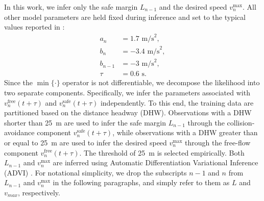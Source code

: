 \documentclass[journal]{IEEEtran}
\begin{document}
In this work, we infer only the safe margin $L_{n-1}$ and the desired speed $v_n^{\max}$. All other model parameters are held fixed during inference and set to the typical values reported in \cite{Gipps1981}:
\begin{align*}
    a_n&=1.7 \text{ m/s}^2, \\ 
    b_n&=-3.4 \text{ m/s}^2, \\
    b_{n-1}&=-3 \text{ m/s}^2, \\
    \tau&=0.6 \text{ s}.
\end{align*}
Since the $\min\{\cdot\}$ operator is not differentiable, we decompose the likelihood into two separate components. Specifically, we infer the parameters associated with $v_n^{\text{free}}(t+\tau)$ and $v_n^{\text{safe}}(t+\tau)$ independently. To this end, the training data are partitioned based on the distance headway (DHW). Observations with a DHW shorter than 25~m are used to infer the safe margin $L_{n-1}$ through the collision-avoidance component $v_n^{\text{safe}}(t+\tau)$, while observations with a DHW greater than or equal to 25~m are used to infer the desired speed $v_n^{\max}$ through the free-flow component $v_n^{\text{free}}(t+\tau)$. The threshold of 25~m is selected empirically. Both $L_{n-1}$ and $v_n^{\max}$ are inferred using Automatic Differentiation Variational Inference (ADVI) \cite{kucukelbir_automatic_2017}. For notational simplicity, we drop the subscripts $n-1$ and $n$ from $L_{n-1}$ and $v_n^{\max}$ in the following paragraphs, and simply refer to them as $L$ and $v_{max}$, respectively.
\end{document}
